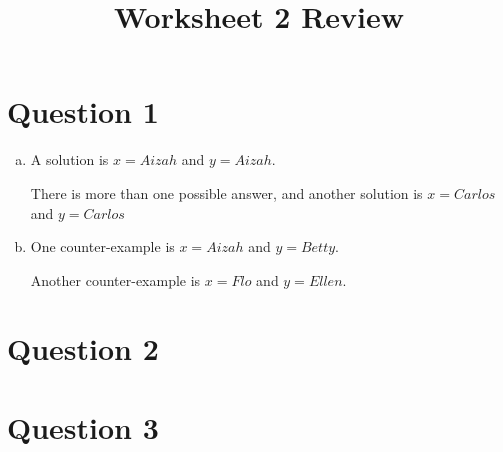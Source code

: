 \documentclass[12pt]{article}
\begin{document}
\title{Worksheet 2 Review}
\maketitle

\section*{Question 1}
\begin{enumerate}[a.]
    \item

    A solution is $x = Aizah$ and $y = Aizah$.

    \bigskip

    There is more than one possible answer, and another solution is $x = Carlos$
    and $y = Carlos$

    \item

    One counter-example is $x = Aizah$ and $y = Betty$.

    \bigskip

    Another counter-example is $x = Flo$ and $y = Ellen$.

\end{enumerate}

\section*{Question 2}

\section*{Question 3}
\end{document}
